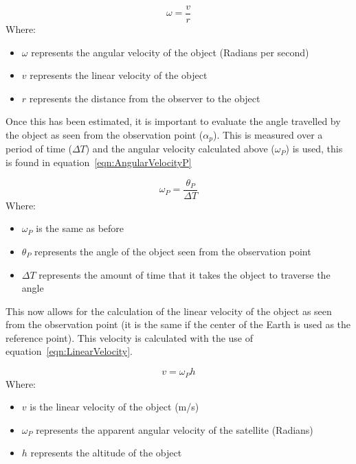 \documentclass[11pt]{witseiepaper}
\begin{document}
\begin{equation} \label{eqn:AngularVelocity}
\omega = \frac{v}{r}
\end{equation}
Where:
\begin{itemize}
    \item $\omega$ represents the angular velocity of the object (Radians per second)
    \item $v$ represents the linear velocity of the object
    \item $r$ represents the distance from the observer to the object
\end{itemize}


Once this has been estimated, it is important to evaluate the angle travelled by the object as seen from the observation point ($\alpha_{p}$). This is measured over a period of time ($\Delta T$) and the angular velocity calculated above ($\omega_{P}$) is used, this is found in equation~\ref{eqn:AngularVelocityP}

\begin{equation} \label{eqn:AngularVelocityP}
    \omega_{P} = \frac{\theta_{P}}{\Delta T}
\end{equation}
Where:
\begin{itemize}
    \item $\omega_{P}$ is the same as before
    \item $\theta_{P}$ represents the angle of the object seen from the observation point
    \item $\Delta T$ represents the amount of time that it takes the object to traverse the angle
\end{itemize}

This now allows for the calculation of the linear velocity of the object as seen from the observation point (it is the same if the center of the Earth is used as the reference point). This velocity is calculated with the use of equation~\ref{eqn:LinearVelocity}.

\begin{equation} \label{eqn:LinearVelocity}
    v = \omega_{P} h
\end{equation}
Where:
\begin{itemize}
    \item $v$ is the linear velocity of the object (m/s)
    \item $\omega_{P}$ represents the apparent angular velocity of the satellite (Radians)
    \item $h$ represents the altitude of the object
\end{itemize}
\end{document}
